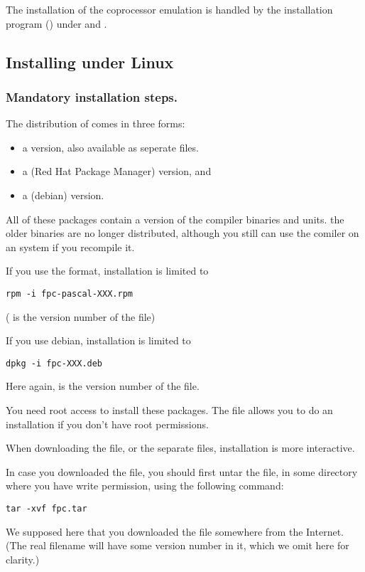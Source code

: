 \documentclass{report}
\begin{document}
The installation of the coprocessor emulation is handled by the
installation program () under \dos and \windows.

%
%
\subsection{Installing under Linux}
\subsubsection{Mandatory installation steps.}
The \linux distribution of \fpc comes in three forms:
\begin{itemize}
\item a  version, also available as seperate files.
\item a  (Red Hat Package Manager) version, and
\item a  (debian) version.
\end{itemize}
All of these packages contain a  version of the compiler binaries and
units. the older  binaries are no longer distributed, although you
still can use the comiler on an  system if you recompile it.

If you use the  format, installation is limited to
\begin{verbatim}
rpm -i fpc-pascal-XXX.rpm
\end{verbatim}
( is the version number of the  file)

If you use debian, installation is limited to
\begin{verbatim}
dpkg -i fpc-XXX.deb
\end{verbatim}
Here again,  is the version number of the  file.

You need root access to install these packages. The  file
allows you to do an installation if you don't have root permissions.

When downloading the  file, or the separate files,
 installation is more interactive.

In case you downloaded the  file, you should first untar
the file, in some directory where
you have write permission, using the following command:
\begin{verbatim}
tar -xvf fpc.tar
\end{verbatim}
We supposed here that you downloaded the file  somewhere
from the Internet. (The real filename will have some version number in it,
which we omit here for clarity.)
\end{document}
